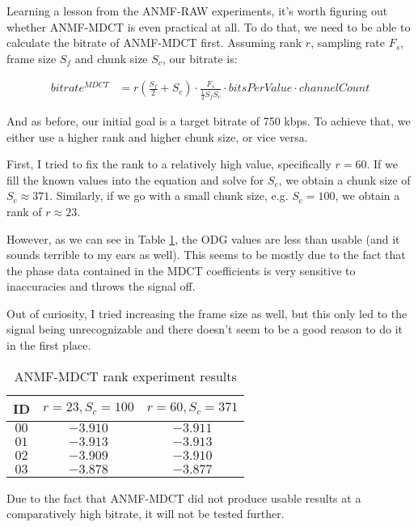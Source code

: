 Learning a lesson from the ANMF-RAW experiments, it's worth figuring out whether ANMF-MDCT is even practical at all. To do that, we need to be able to calculate the bitrate of ANMF-MDCT first. Assuming rank $r$, sampling rate $F_s$, frame size $S_f$ and chunk size $S_c$, our bitrate is:

\begin{align}
bitrate^{MDCT} &= r(\frac{S_f}{2} + S_c) \cdot \frac{F_s}{\frac12 S_fS_c} \cdot bitsPerValue \cdot channelCount
\end{align}

And as before, our initial goal is a target bitrate of 750 kbps. To achieve that, we either use a higher rank and higher chunk size, or vice versa.

First, I tried to fix the rank to a relatively high value, specifically $r = 60$. If we fill the known values into the equation and solve for $S_c$, we obtain a chunk size of $S_c \approx 371$. Similarly, if we go with a small chunk size, e.g. $S_c = 100$, we obtain a rank of $r \approx 23$.

However, as we can see in Table \ref{tab:anmf_mdct_rank}, the ODG values are less than usable (and it sounds terrible to my ears as well). This seems to be mostly due to the fact that the phase data contained in the MDCT coefficients is very sensitive to inaccuracies and throws the signal off.

Out of curiosity, I tried increasing the frame size as well, but this only led to the signal being unrecognizable and there doesn't seem to be a good reason to do it in the first place.

\begin{table}[htbp]\caption{ANMF-MDCT rank experiment results}
	\label{tab:anmf_mdct_rank}
	\centering
	\begin{tabular}{|c|c|c|}
		\hline
		ID & $r = 23, S_c = 100$ & $r = 60, S_c = 371$ \\ \hline
		$00$ & $-3.910$ & $-3.911$ \\
		$01$ & $-3.913$ & $-3.913$ \\
		$02$ & $-3.909$ & $-3.910$ \\
		$03$ & $-3.878$ & $-3.877$ \\		
		\hline
	\end{tabular}
\end{table}

Due to the fact that ANMF-MDCT did not produce usable results at a comparatively high bitrate, it will not be tested further.


